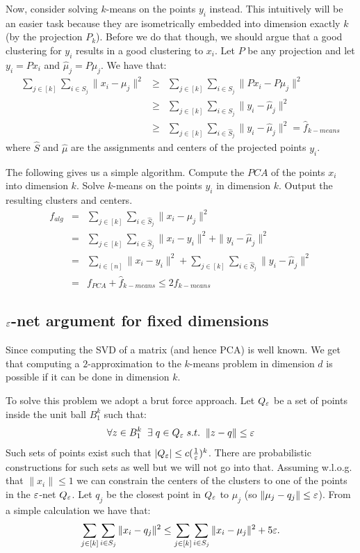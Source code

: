 Now, consider solving $k$-means on the points $y_i$ instead. This intuitively will be an easier task
because they are isometrically embedded into dimension exactly $k$ (by the projection $P_k$). 
Before we do that though, we should argue that a good clustering for $y_i$ results in a good clustering to $x_i$.
Let $P$ be any projection and let $y_i = Px_i$ and $\hat{\mu}_{j} = P{\mu}_{j}$. We have that:
\begin{eqnarray}
\sum_{j \in [k]} \sum_{i \in S_j}  \|x_i - \mu_j \|^2 &\ge& \sum_{j \in [k]} \sum_{i \in S_j}  \|Px_i - P\mu_j \|^2 \\
&\ge& \sum_{j \in [k]} \sum_{i \in S_j}  \|y_i - \hat{\mu}_{j}\|^2 \\
&\ge& \sum_{j \in [k]} \sum_{i \in \hat{S}_j}  \|y_i - \hat{\mu}_{j}\|^2 = \hat{f}_{k-means}
\end{eqnarray}
where $\hat{S}$ and $\hat{\mu}$ are the assignments and centers of the projected points $y_i$.


The following gives us a simple algorithm. Compute the $PCA$ of the points $x_i$ into dimension $k$.
Solve $k$-means on the points $y_i$ in dimension $k$. Output the resulting clusters and centers.
\begin{eqnarray}
f_{alg} &=& \sum_{j \in [k]} \sum_{i \in \hat{S}_j} \|x_i -\hat{\mu}_j \|^2 \\
&=& \sum_{j \in [k]} \sum_{i \in \hat{S}_j} \|x_i -y_i \|^2 + \|y_i - \hat{\mu}_j\|^2 \\
&= & \sum_{i \in [n]} \|x_i -y_i \|^2 + \sum_{j \in [k]} \sum_{i \in \hat{S}_j}\|y_i - \hat{\mu}_j\|^2 \\
&=& f_{PCA} + \hat{f}_{k-means} \le 2f_{k-means}
\end{eqnarray}

\subsection{$\varepsilon$-net argument for fixed dimensions}
Since computing the SVD of a matrix (and hence PCA) is well known. 
We get that computing a $2$-approximation to 
the $k$-means problem in dimension $d$ is possible if it can be done in dimension $k$.

To solve this problem we adopt a brut force approach.
Let $Q_{\varepsilon}$ be a set of points inside the unit ball $B^{k}_{1}$ such that:
\[
\forall z \in B^{k}_{1} \;\; \exists \; q \in Q_{\varepsilon} \; s.t. \;\; \|z - q\| \le \varepsilon
\]
Such sets of points exist such that  $|Q_{\varepsilon}| \le c(\frac{1}{\varepsilon})^k$. There are 
probabilistic constructions for such sets as well but we will not go into that.
Assuming w.l.o.g. that $\|x_i\| \le 1$ we can constrain the centers of 
the clusters to one of the points in the $\varepsilon$-net $Q_{\varepsilon}$.
Let $q_j$ be the closest point in $Q_{\varepsilon}$ to $\mu_j$ (so $\|\mu_j - q_j \| \le \varepsilon$).
From a simple calculation we have that:
\[
\sum_{j \in [k]} \sum_{i \in S_j} \|x_i - q_j \|^2 \le  \sum_{j \in [k]} \sum_{i \in S_j} \|x_i - \mu_j \|^2 + 5\varepsilon.
\]
 
